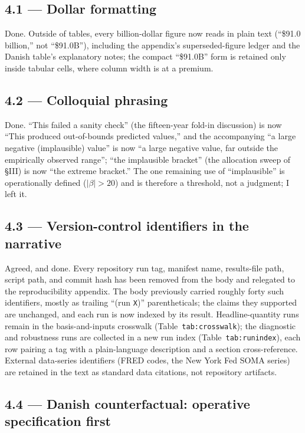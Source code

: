 \documentclass[11pt]{article}
\newcommand{\mlabel}[1]{\texttt{#1}}
\begin{document}
\subsection*{4.1 --- Dollar formatting}

Done. Outside of tables, every billion-dollar figure now reads in plain text
(``\$91.0 billion,'' not ``\$91.0B''), including the appendix's
superseded-figure ledger and the Danish table's explanatory notes; the compact
``\$91.0B'' form is retained only inside tabular cells, where column width is at
a premium.

\subsection*{4.2 --- Colloquial phrasing}

Done. ``This failed a sanity check'' (the fifteen-year fold-in discussion) is
now ``This produced out-of-bounds predicted values,'' and the accompanying ``a
large negative (implausible) value'' is now ``a large negative value, far
outside the empirically observed range''; ``the implausible bracket'' (the
allocation sweep of \S III) is now ``the extreme bracket.'' The one remaining
use of ``implausible'' is operationally defined ($|\beta| > 20$) and is
therefore a threshold, not a judgment; I left it.

\subsection*{4.3 --- Version-control identifiers in the narrative}

Agreed, and done. Every repository run tag, manifest name, results-file path,
script path, and commit hash has been removed from the body and relegated to the
reproducibility appendix. The body previously carried roughly forty such
identifiers, mostly as trailing ``(run \texttt{X})'' parentheticals; the claims
they supported are unchanged, and each run is now indexed by its result.
Headline-quantity runs remain in the basis-and-inputs crosswalk
(Table~\mlabel{tab:crosswalk}); the diagnostic and robustness runs are collected
in a new run index (Table~\mlabel{tab:runindex}), each row pairing a tag with a
plain-language description and a section cross-reference. External data-series
identifiers (FRED codes, the New York Fed SOMA series) are retained in the text
as standard data citations, not repository artifacts.

\subsection*{4.4 --- Danish counterfactual: operative specification first}
\end{document}
